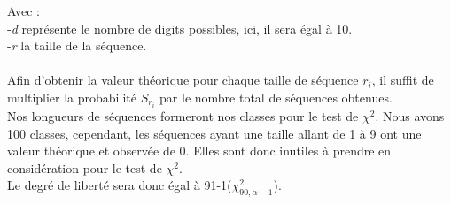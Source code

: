 \documentclass[french]{article}
\begin{document}
Avec :
\\
	-\textit{d} représente le nombre de digits possibles, ici, il sera égal à 10.
	\\
	-\textit{r} la taille de la séquence.
\\
\\
Afin d'obtenir la valeur théorique pour chaque taille de séquence \textit{$ r_{i} $}, il suffit de multiplier la probabilité $S_{r_{i}}$  par le nombre total de séquences obtenues.
\\


Nos longueurs de séquences formeront nos classes pour le test de $\chi^{2}$. Nous avons 100 classes, cependant, les séquences ayant une taille allant de 1 à 9 ont une valeur théorique et observée de 0. Elles sont donc inutiles à prendre en considération pour le test de $\chi^{2}$.
\\
Le degré de liberté sera donc égal à 91-1($\chi^{2}_{90,\alpha-1}$).
\newpage
\end{document}
